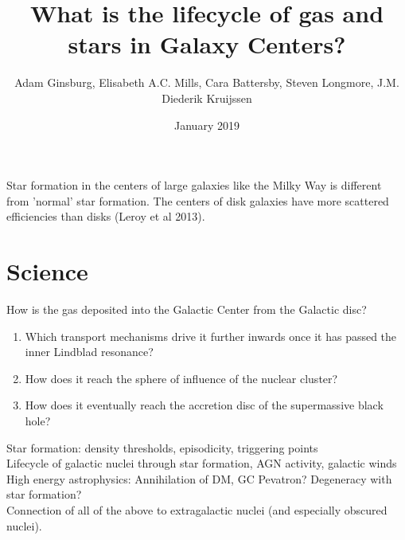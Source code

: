 \documentclass{article}
\title{What is the lifecycle of gas and stars in Galaxy Centers?}
\author{Adam Ginsburg, Elisabeth A.C. Mills, Cara Battersby, Steven Longmore, J.M. Diederik Kruijssen}
\date{January 2019}
\begin{document}
\maketitle

Star formation in the centers of large galaxies like the Milky Way is different from 'normal' star formation. %
The centers of disk galaxies have more scattered efficiencies than disks (Leroy et al 2013). 



\section{Science}
How is the gas deposited into the Galactic Center from the Galactic disc?
\begin{enumerate}
    \item Which transport mechanisms drive it further inwards once it has passed the inner Lindblad resonance?
    \item How does it reach the sphere of influence of the nuclear cluster?
    \item How does it eventually reach the accretion disc of the supermassive black hole?
\end{enumerate}
Star formation: density thresholds, episodicity, triggering points\\
Lifecycle of galactic nuclei through star formation, AGN activity, galactic winds
High energy astrophysics: Annihilation of DM, GC Pevatron? Degeneracy with star formation?\\
Connection of all of the above to extragalactic nuclei (and especially obscured nuclei).
\end{document}
